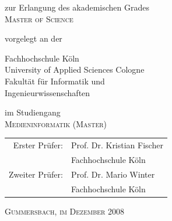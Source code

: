 \begin{titlepage}
\begin{center}
\vspace{0.6cm}

\begin{large}
zur Erlangung des akademischen Grades\\
\vspace{0.2cm}
\textsc{Master of Science}\\ 
\end{large}

\vspace{0.4cm}

\begin{large}
vorgelegt an der\\ 
\vspace{0.2cm}
\begin{scshape}
Fachhochschule Köln\\
University of Applied Sciences Cologne\\
Fakultät für Informatik und\\
Ingenieurwissenschaften\\
\end{scshape}
\end{large}

\vspace{0.4cm}

\begin{large}
im Studiengang\\ 
\vspace{0.2cm}
\textsc{Medieninformatik (Master)}
\end{large}

\vspace{0.7cm}

\begin{tabular}{rl}
        Erster Prüfer:  &  Prof. Dr. Kristian Fischer\\
       							    &  \small Fachhochschule Köln \\[1.0em]
       Zweiter Prüfer:  &  Prof. Dr. Mario Winter\\
       							    &  \small Fachhochschule Köln \\
\end{tabular}

\vspace{0.5cm}

\textsc{Gummersbach, im Dezember 2008}


\end{center}
\end{titlepage}
